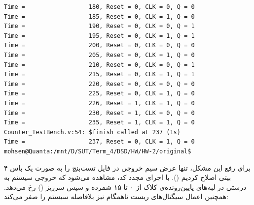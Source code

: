 \begin{latin}
\begin{lstlisting}[basicstyle=\ttfamily\small, breaklines=true, postbreak=\mbox{\textcolor{red}{$\hookrightarrow$}\space}]
Time =                  180, Reset = 0, CLK = 0, Q = 0
Time =                  185, Reset = 0, CLK = 1, Q = 0
Time =                  190, Reset = 0, CLK = 0, Q = 1
Time =                  195, Reset = 0, CLK = 1, Q = 1
Time =                  200, Reset = 0, CLK = 0, Q = 0
Time =                  205, Reset = 0, CLK = 1, Q = 0
Time =                  210, Reset = 0, CLK = 0, Q = 1
Time =                  215, Reset = 0, CLK = 1, Q = 1
Time =                  220, Reset = 0, CLK = 0, Q = 0
Time =                  225, Reset = 0, CLK = 1, Q = 0
Time =                  226, Reset = 1, CLK = 1, Q = 0
Time =                  230, Reset = 1, CLK = 0, Q = 0
Time =                  235, Reset = 1, CLK = 1, Q = 0
Counter_TestBench.v:54: $finish called at 237 (1s)
Time =                  237, Reset = 0, CLK = 1, Q = 0
mohsen@Quanta:/mnt/D/SUT/Term_4/DSD/HW/HW-2/original$ 
\end{lstlisting}
\end{latin}

برای رفع این مشکل، تنها عرض سیم خروجی در فایل تست‌بنچ را به صورت یک باس ۴ بیتی اصلاح کردیم (). با اجرای مجدد کد، مشاهده می‌شود که خروجی سیستم به درستی در لبه‌های پایین‌رونده‌ی کلاک از ۰ تا ۱۵ شمرده و سپس سرریز () رخ می‌دهد. همچنین اعمال سیگنال‌های ریست ناهمگام نیز بلافاصله سیستم را صفر می‌کند:

